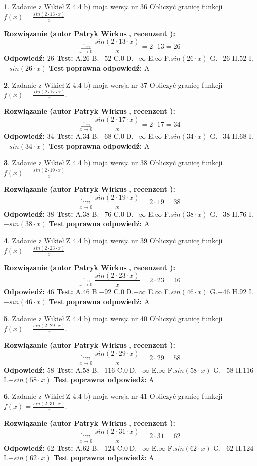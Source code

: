 \documentclass[12pt, a4paper]{article}
\theoremstyle{definition} %
\newtheorem{zad}{}
\newcommand{\zadStart}[1]{\begin{zad}#1\newline}
\newcommand{\zadStop}{\end{zad}}
\newcommand{\rozwStart}[2]{\noindent \textbf{Rozwiązanie (autor #1 , recenzent #2): }\newline}
\newcommand{\rozwStop}{\newline}
\newcommand{\odpStart}{\noindent \textbf{Odpowiedź:}\newline}
\newcommand{\odpStop}{\newline}
\newcommand{\testStart}{\noindent \textbf{Test:}\newline}
\newcommand{\testStop}{\newline}
\newcommand{\kluczStart}{\noindent \textbf{Test poprawna odpowiedź:}\newline}
\newcommand{\kluczStop}{\newline}
\begin{document}
\zadStart{Zadanie z Wikieł Z 4.4 b) moja wersja nr 36}
Obliczyć granicę funkcji $f(x)=\frac{sin(2 \cdot13\cdot x)}{x}$.
\zadStop
\rozwStart{Patryk Wirkus}{}
$$\lim\limits_{x\to 0}\frac{sin(2 \cdot 13\cdot x)}{x}=
2 \cdot 13 = 26$$
\rozwStop
\odpStart
$26$
\odpStop
\testStart
A.$26$
B.$-52$
C.$0$
D.$-\infty$
E.$\infty$
F.$sin(26\cdot x)$
G.$-26$
H.$52$
I.$-sin(26\cdot x)$
\testStop
\kluczStart
A
\kluczStop



\zadStart{Zadanie z Wikieł Z 4.4 b) moja wersja nr 37}
Obliczyć granicę funkcji $f(x)=\frac{sin(2 \cdot17\cdot x)}{x}$.
\zadStop
\rozwStart{Patryk Wirkus}{}
$$\lim\limits_{x\to 0}\frac{sin(2 \cdot 17\cdot x)}{x}=
2 \cdot 17 = 34$$
\rozwStop
\odpStart
$34$
\odpStop
\testStart
A.$34$
B.$-68$
C.$0$
D.$-\infty$
E.$\infty$
F.$sin(34\cdot x)$
G.$-34$
H.$68$
I.$-sin(34\cdot x)$
\testStop
\kluczStart
A
\kluczStop



\zadStart{Zadanie z Wikieł Z 4.4 b) moja wersja nr 38}
Obliczyć granicę funkcji $f(x)=\frac{sin(2 \cdot19\cdot x)}{x}$.
\zadStop
\rozwStart{Patryk Wirkus}{}
$$\lim\limits_{x\to 0}\frac{sin(2 \cdot 19\cdot x)}{x}=
2 \cdot 19 = 38$$
\rozwStop
\odpStart
$38$
\odpStop
\testStart
A.$38$
B.$-76$
C.$0$
D.$-\infty$
E.$\infty$
F.$sin(38\cdot x)$
G.$-38$
H.$76$
I.$-sin(38\cdot x)$
\testStop
\kluczStart
A
\kluczStop



\zadStart{Zadanie z Wikieł Z 4.4 b) moja wersja nr 39}
Obliczyć granicę funkcji $f(x)=\frac{sin(2 \cdot23\cdot x)}{x}$.
\zadStop
\rozwStart{Patryk Wirkus}{}
$$\lim\limits_{x\to 0}\frac{sin(2 \cdot 23\cdot x)}{x}=
2 \cdot 23 = 46$$
\rozwStop
\odpStart
$46$
\odpStop
\testStart
A.$46$
B.$-92$
C.$0$
D.$-\infty$
E.$\infty$
F.$sin(46\cdot x)$
G.$-46$
H.$92$
I.$-sin(46\cdot x)$
\testStop
\kluczStart
A
\kluczStop



\zadStart{Zadanie z Wikieł Z 4.4 b) moja wersja nr 40}
Obliczyć granicę funkcji $f(x)=\frac{sin(2 \cdot29\cdot x)}{x}$.
\zadStop
\rozwStart{Patryk Wirkus}{}
$$\lim\limits_{x\to 0}\frac{sin(2 \cdot 29\cdot x)}{x}=
2 \cdot 29 = 58$$
\rozwStop
\odpStart
$58$
\odpStop
\testStart
A.$58$
B.$-116$
C.$0$
D.$-\infty$
E.$\infty$
F.$sin(58\cdot x)$
G.$-58$
H.$116$
I.$-sin(58\cdot x)$
\testStop
\kluczStart
A
\kluczStop



\zadStart{Zadanie z Wikieł Z 4.4 b) moja wersja nr 41}
Obliczyć granicę funkcji $f(x)=\frac{sin(2 \cdot31\cdot x)}{x}$.
\zadStop
\rozwStart{Patryk Wirkus}{}
$$\lim\limits_{x\to 0}\frac{sin(2 \cdot 31\cdot x)}{x}=
2 \cdot 31 = 62$$
\rozwStop
\odpStart
$62$
\odpStop
\testStart
A.$62$
B.$-124$
C.$0$
D.$-\infty$
E.$\infty$
F.$sin(62\cdot x)$
G.$-62$
H.$124$
I.$-sin(62\cdot x)$
\testStop
\kluczStart
A
\kluczStop
\end{document}
